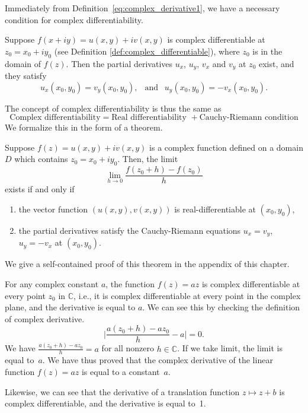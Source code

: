 Immediately from Definition~\ref{eq:complex_derivative1}, we have a necessary condition for complex differentiability.
\begin{svgraybox}
	\begin{theorem} 	\label{thm:CR}
		Suppose $f(x+iy) = u(x,y)+i v(x,y)$ is complex differentiable at $z_0=x_0+iy_0$ (see Definition \ref{def:complex_differentiable}), where $z_0$ is in the domain of $f(z)$. Then the partial derivatives $u_x$, $u_y$, $v_x$ and $v_y$ at $z_0$ exist, and they satisfy
		$$
		u_x(x_0,y_0) = v_y(x_0,y_0),\ \ \text{ and } \ \ u_y(x_0,y_0) = -v_x(x_0,y_0).
		$$
	\end{theorem}
\end{svgraybox}

The concept of complex differentiability is thus the same as
$$
	\boxed{\textrm{Complex differentiability} = \textrm{Real differentiability } +  \textrm{Cauchy-Riemann condition}}
$$
We formalize this in the form of a theorem.

\renewcommand{\labelenumi}{(\roman{enumi}).}
\begin{svgraybox}
	\begin{theorem}
		Suppose $f(z) = u(x, y)+iv(x, y)$ is a complex function defined on a domain $D$ which
		contains $z_0 = x_0 + iy_0$. Then, the limit 
$$
\lim_{h\rightarrow 0} \frac{f(z_0+h) - f(z_0)}{h}
$$		
		exists
		if and only if 
\begin{enumerate}
	\item the vector function $(u(x, y), v(x, y))$ is real-differentiable at $(x_0, y_0)$,
	\item   the partial derivatives satisfy the Cauchy-Riemann equations
	$
	u_x = v_y$, $u_y = -v_x$ at $(x_0,y_0)$.
\end{enumerate}		
		 \label{thm:complex_differentiable_equivalent_condition}
	\end{theorem}
\end{svgraybox}

We give a self-contained proof of this theorem in the appendix of this chapter.

\begin{example}
	For any complex constant $a$, the function $f(z) = az$ is complex differentiable at every point $z_0$ in $\mathbb{C}$, i.e., it is complex differentiable at every point in the complex plane, and the derivative is equal to $a$. We can see this by checking the definition of complex derivative.
	$$
	\Big| \frac{a(z_0 +h) - az_0}{h} - a\Big|= 0.
	$$
	We have $\frac{a(z_0 +h) - a z_0}{h} =a$ for all nonzero $h\in\mathbb{C}$. If we take limit, the limit is equal to~$a$. We have thus proved that the complex derivative of the linear function $f(z)=az$ is equal to a constant~$a$.
	
	Likewise, we can see that the derivative of a translation function $z\mapsto z+b$ is complex differentiable, and the derivative is equal to~1.
	\label{}
\end{example}

